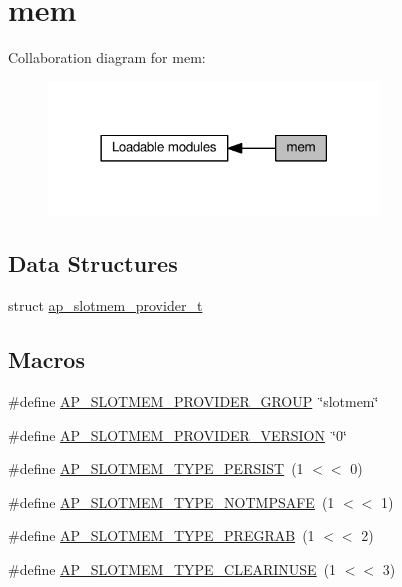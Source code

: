 \hypertarget{group__MEM}{}\section{mem}
\label{group__MEM}
Collaboration diagram for mem\+:
\nopagebreak
\begin{figure}[H]
\begin{center}
\leavevmode
\includegraphics[width=249pt]{group__MEM}
\end{center}
\end{figure}
\subsection*{Data Structures}
\begin{DoxyCompactItemize}
\item 
struct \hyperlink{structap__slotmem__provider__t}{ap\+\_\+slotmem\+\_\+provider\+\_\+t}
\end{DoxyCompactItemize}
\subsection*{Macros}
\begin{DoxyCompactItemize}
\item 
\#define \hyperlink{group__MEM_ga6b98470b614c6c51ddce1a5f0e097326}{A\+P\+\_\+\+S\+L\+O\+T\+M\+E\+M\+\_\+\+P\+R\+O\+V\+I\+D\+E\+R\+\_\+\+G\+R\+O\+UP}~\char`\"{}slotmem\char`\"{}
\item 
\#define \hyperlink{group__MEM_gaf32bd4ccfa99239df388ad00c3f6725f}{A\+P\+\_\+\+S\+L\+O\+T\+M\+E\+M\+\_\+\+P\+R\+O\+V\+I\+D\+E\+R\+\_\+\+V\+E\+R\+S\+I\+ON}~\char`\"{}0\char`\"{}
\item 
\#define \hyperlink{group__MEM_ga0d9a692b2603b21b572b13b78a750bfb}{A\+P\+\_\+\+S\+L\+O\+T\+M\+E\+M\+\_\+\+T\+Y\+P\+E\+\_\+\+P\+E\+R\+S\+I\+ST}~(1 $<$$<$ 0)
\item 
\#define \hyperlink{group__MEM_gade68dc31285d0596605eae5342a55972}{A\+P\+\_\+\+S\+L\+O\+T\+M\+E\+M\+\_\+\+T\+Y\+P\+E\+\_\+\+N\+O\+T\+M\+P\+S\+A\+FE}~(1 $<$$<$ 1)
\item 
\#define \hyperlink{group__MEM_gad8d72be33e9ff46cacc4b93eb858c604}{A\+P\+\_\+\+S\+L\+O\+T\+M\+E\+M\+\_\+\+T\+Y\+P\+E\+\_\+\+P\+R\+E\+G\+R\+AB}~(1 $<$$<$ 2)
\item 
\#define \hyperlink{group__MEM_ga5d9011c86b7637bd01fdac78fda69184}{A\+P\+\_\+\+S\+L\+O\+T\+M\+E\+M\+\_\+\+T\+Y\+P\+E\+\_\+\+C\+L\+E\+A\+R\+I\+N\+U\+SE}~(1 $<$$<$ 3)
\end{DoxyCompactItemize}
